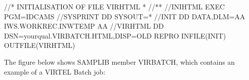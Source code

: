 \documentclass[letterpaper,10pt,english]{sphinxmanual}
\begin{document}
\begin{sphinxVerbatim}[commandchars=\\\{\}]
//* INITIALISATION OF FILE VIRHTML *
//*\PYGZhy{}\PYGZhy{}\PYGZhy{}\PYGZhy{}\PYGZhy{}\PYGZhy{}\PYGZhy{}\PYGZhy{}\PYGZhy{}\PYGZhy{}\PYGZhy{}\PYGZhy{}\PYGZhy{}\PYGZhy{}\PYGZhy{}\PYGZhy{}\PYGZhy{}\PYGZhy{}\PYGZhy{}\PYGZhy{}\PYGZhy{}\PYGZhy{}\PYGZhy{}\PYGZhy{}\PYGZhy{}\PYGZhy{}\PYGZhy{}\PYGZhy{}\PYGZhy{}\PYGZhy{}\PYGZhy{}\PYGZhy{}\PYGZhy{}\PYGZhy{}\PYGZhy{}\PYGZhy{}\PYGZhy{}\PYGZhy{}\PYGZhy{}\PYGZhy{}\PYGZhy{}\PYGZhy{}\PYGZhy{}\PYGZhy{}\PYGZhy{}\PYGZhy{}\PYGZhy{}\PYGZhy{}\PYGZhy{}\PYGZhy{}\PYGZhy{}\PYGZhy{}\PYGZhy{}\PYGZhy{}\PYGZhy{}\PYGZhy{}\PYGZhy{}\PYGZhy{}\PYGZhy{}\PYGZhy{}\PYGZhy{}\PYGZhy{}\PYGZhy{}\PYGZhy{}*
//INIHTML EXEC PGM=IDCAMS
//SYSPRINT DD SYSOUT=*
//INIT DD DATA,DLM=AA
    \PYGZdl{}\PYGZdl{}\PYGZdl{}\PYGZdl{}IWS.WORKREC.INW\PYGZdl{}TEMP
    AA
//VIRHTML DD DSN=yourqual.VIRBATCH.HTML,DISP=OLD
    REPRO INFILE(INIT) OUTFILE(VIRHTML)
\end{sphinxVerbatim}



The figure below shows SAMPLIB member VIRBATCH, which contains an example of a VIRTEL Batch job:
\end{document}
